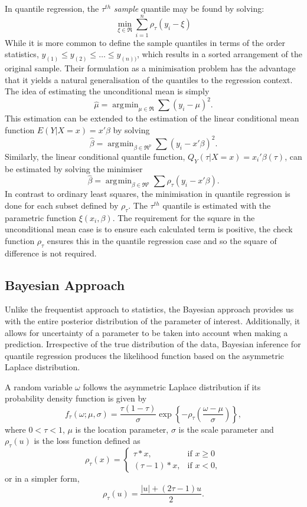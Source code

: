\documentclass[12pt,a4paper]{report}
\DeclareMathOperator*{\argmin}{\arg\!\min}
\begin{document}
In quantile regression, the $\tau^{th}$ \textit{sample} quantile may be found by solving:
\begin{equation}
\label{eq:QR-min}
    \min_{\xi\in\Re}\sum^{n}_{i=1}\rho_{\tau}(y_{i}-\xi)
\end{equation}
While it is more common to define the sample quantiles in terms of the order statistics, $y_{(1)}\leq y_{(2)} \leq \ldots \leq y_{(n))}$, which results in a sorted arrangement of the original sample. Their formulation as a minimisation problem has the advantage that it yields a natural generalisation of the quantiles to the regression context.
The idea of estimating the unconditional mean is simply
$$ \hat{\mu}=\argmin_{\mu\in\Re}\sum(y_{i}-\mu)^{2}.$$
This estimation can be extended to the estimation of the linear conditional mean function $E(Y|X=x)=x'\beta$ by solving
$$ \hat{\beta}=\argmin_{\beta\in\Re^{p}}\sum(y_{i}-x'\beta)^2.$$
Similarly, the linear conditional quantile function, $Q_{Y}(\tau|X=x)=x_{i}'\beta(\tau)$, can be estimated by solving the minimiser
$$ \hat{\beta}=\argmin_{\beta\in\Re^{p}}\sum\rho_{\tau}(y_{i}-x'\beta).$$
In contrast to ordinary least squares, the minimisation in quantile regression is done for each subset defined by $\rho_{\tau}$. The $\tau^{th}$ quantile is estimated with the parametric function $\xi(x_{i},\beta)$. The requirement for the square in the unconditional mean case is to ensure each calculated term is positive, the check function $\rho_{\tau}$ ensures this in the quantile regression case and so the square of difference is not required.

\subsection{Bayesian Approach}
Unlike the frequentist approach to statistics, the Bayesian approach provides us with the entire posterior distribution of the parameter of interest. Additionally, it allows for uncertainty of a parameter to be taken into account when making a prediction. Irrespective of the true distribution of the data, Bayesian inference for quantile regression produces the likelihood function based on the asymmetric Laplace distribution.
\vspace{2mm}

A random variable $\omega$ follows the asymmetric Laplace distribution if its probability density function is given by
$$ f_{\tau}(\omega; \mu,\sigma) = \frac{\tau(1-\tau)}{\sigma}\exp\left\{-\rho_{\tau}\left(\frac{\omega-\mu}{\sigma}\right)\right\}, $$
where $0<\tau<1$, $\mu$ is the location parameter, $\sigma$ is the scale parameter and $\rho_{\tau}(u)$ is the loss function defined as
    \[
        \rho_{\tau}(x)=
        \begin{cases}
        \tau*x,& \text{if } x\geq0\\
        (\tau-1)*x,& \text{if } x<0,
        \end{cases}
    \]
or in a simpler form,
\begin{equation}
\label{eq:Bay-QR}
\rho_{\tau}(u)=\frac{|u|+(2\tau-1)u}{2}.
\end{equation}
\vspace{2mm}
\end{document}
